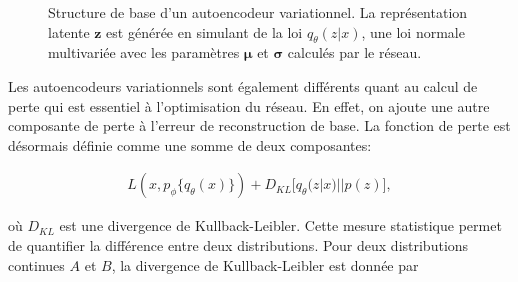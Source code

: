 \begin{figure}[ht]
	\DIFdelbeginFL %
\DIFdelendFL \DIFaddbeginFL \caption[Structure de base d'un autoencodeur variationnel.]{\DIFaddendFL Structure de base d'un autoencodeur variationnel. La représentation latente $\boldsymbol{z}$ est générée en simulant de la loi $q_{\theta}(z|x)$,  une loi normale multivariée avec les paramètres $\boldsymbol{\mu}$ et $\boldsymbol{\sigma}$ calculés par le réseau.}
	\label{fig:VAEstructure}
\end{figure}

Les autoencodeurs variationnels sont également différents quant au calcul de perte qui est essentiel à l'optimisation du réseau. En effet, on ajoute une autre composante de perte à l'erreur de reconstruction de base. La fonction de perte est désormais définie comme une somme de deux composantes:

\begin{gather}  \label{eq:loss_vae}
L(x, p_\phi\{q_\theta(x)\}) + D_{KL}\big[q_\theta(z|x) || p(z)\big],
\end{gather}


où $D_{KL}$ est une divergence de Kullback-Leibler. Cette mesure statistique permet de quantifier la différence entre deux distributions. Pour deux distributions continues $A$ et $B$, \DIFaddbegin {}\DIFaddend la divergence de Kullback-Leibler est donnée par

